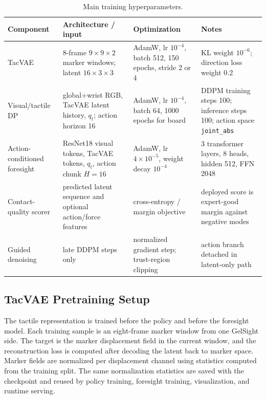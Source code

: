 \documentclass[10pt,letterpaper]{article}
\newcommand{\tabstyle}{\small\setlength{\tabcolsep}{3pt}\renewcommand{\arraystretch}{1.15}}
\begin{document}
\begin{table}[t]
\caption{Main training hyperparameters.}
\label{tab:train_hparams}
\centering
\tabstyle
\begin{tabular}{p{}p{}p{}p{}}
\toprule
Component & Architecture / input & Optimization & Notes\\
\midrule
TacVAE &
8-frame $9 \times 9 \times 2$ marker windows; latent $16 \times 3 \times 3$ &
AdamW, lr $10^{-4}$, batch 512, 150 epochs, stride 2 or 4 &
KL weight $10^{-6}$; direction loss weight 0.2\\
Visual/tactile DP &
global+wrist RGB, TacVAE latent history, $q_t$; action horizon 16 &
AdamW, lr $10^{-4}$, batch 64, 1000 epochs for board &
DDPM training steps 100; inference steps 100; action space \texttt{joint\_abs}\\
Action-conditioned foresight &
ResNet18 visual tokens, TacVAE tokens, $q_t$, action chunk $H=16$ &
AdamW, lr $4{\times}10^{-5}$, weight decay $10^{-4}$ &
3 transformer layers, 8 heads, hidden 512, FFN 2048\\
Contact-quality scorer &
predicted latent sequence and optional action/force features &
cross-entropy / margin objective &
deployed score is expert-good margin against negative modes\\
Guided denoising &
late DDPM steps only &
normalized gradient step; trust-region clipping &
action branch detached in latent-only path\\
\bottomrule
\end{tabular}
\end{table}

\subsection{TacVAE Pretraining Setup}

The tactile representation is trained before the policy and before the
foresight model. Each training sample is an eight-frame marker window from one
GelSight side. The target is the marker displacement field in the current
window, and the reconstruction loss is computed after decoding the latent back
to marker space. Marker fields are normalized per displacement channel using
statistics computed from the training split. The same normalization statistics
are saved with the checkpoint and reused by policy training, foresight
training, visualization, and runtime serving.
\end{document}

